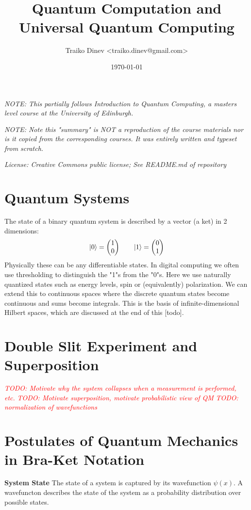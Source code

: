 \documentclass{article}
\title{Quantum Computation and Universal Quantum Computing}
\date{\today}
\author{Traiko Dinev \textless traiko.dinev@gmail.com\textgreater}
\newcommand{\eps}{\epsilon}
\newcommand{\comment}[1][]{#1} %
\newcommand{\todo}[1]{\comment{\textcolor{Red}{\textit{\lbrack TODO: #1 \rbrack}}}}
\begin{document}
\maketitle
\textit{NOTE: This partially follows Introduction to Quantum Computing, a masters level course at the University of Edinburgh.}

\textit{NOTE: Note this "summary" is NOT a reproduction of the course materials nor is it copied from the corresponding courses. It was entirely written and typeset from scratch.}

\textit{License: Creative Commons public license; See README.md of repository}

\newcommand{\epsplus}{\left( \frac{1}{2} + \eps \right)^{1/2}}
\newcommand{\epsminus}{\left( \frac{1}{2} - \eps \right)^{1/2}}

\section{Quantum Systems}
The state of a binary quantum system is described by a vector (a ket) in 2 dimensions:
\begin{gather}
    \ket{0} = \begin{pmatrix}1 \\ 0\end{pmatrix} \qquad
    \ket{1} = \begin{pmatrix}0 \\ 1\end{pmatrix} \\
\end{gather}
% 
Physically these can be any differentiable states. In digital computing we often use thresholding to distinguish the "1"s from the "0"s. Here we use naturally quantized states such as energy levels, spin or (equivalently) polarization. We can extend this to continuous spaces where the discrete quantum states become continuous and sums become integrals. This is the basis of infinite-dimensional Hilbert spaces, which are discussed at the end of this [todo].

\section{Double Slit Experiment and Superposition}
\todo{Motivate why the system collapses when a measurement is performed, etc.} \todo{Motivate superposition, motivate probabilistic view of QM} 
\todo{normalization of wavefunctions}

\section{Postulates of Quantum Mechanics in Bra-Ket Notation}
\textbf{System State}
The state of a system is captured by its wavefunction $\psi(x)$. A wavefuncton describes the state of the system as a probability distribution over possible states.
\vskip 0.15in
\end{document}
